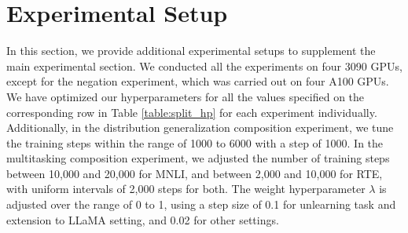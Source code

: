 

\section{Experimental Setup}
\label{sec:apx_exp_setup}

In this section, we provide additional experimental setups to supplement the main experimental section. We conducted all the experiments on four 3090 GPUs, except for the negation experiment, which was carried out on four A100 GPUs.
We have optimized our hyperparameters for all the values specified on the corresponding row in Table \ref{table:split_hp} for each experiment individually. 
Additionally, in the distribution generalization composition experiment, we tune the training steps within the range of 1000 to 6000 with a step of 1000. In the multitasking composition experiment, we adjusted the number of training steps between 10,000 and 20,000 for MNLI, and between 2,000 and 10,000 for RTE, with uniform intervals of 2,000 steps for both.
The weight hyperparameter $\lambda$ is adjusted over the range of 0 to 1, using a step size of 0.1 for unlearning task and extension to LLaMA setting, and 0.02 for other settings.

